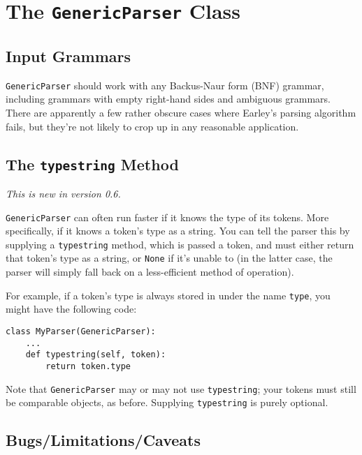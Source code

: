 \documentclass{article}
\newcommand{\code}[1]{\texttt{#1}}
\begin{document}
\section{The \code{GenericParser} Class}

\subsection{Input Grammars}

\code{GenericParser} should work with any Backus-Naur form (BNF) grammar,
including grammars
with empty right-hand sides and ambiguous grammars.
There are apparently a few rather obscure cases where Earley's parsing algorithm
fails, but they're not likely to crop up in any reasonable application.

\subsection{The \code{typestring} Method}

\emph{This is new in version 0.6.}

\code{GenericParser} can often run faster if it knows the type of its
tokens.  More specifically, if it knows a token's type as a string.  You
can tell the parser this by supplying a \code{typestring} method, which is
passed a token, and must either return that token's type as a string, or
\code{None} if it's unable to (in the latter case, the parser will simply
fall back on a less-efficient method of operation).

For example, if a token's type is always stored in under the name \code{type},
you might have the following code:

\begin{verbatim}
class MyParser(GenericParser):
    ...
    def typestring(self, token):
        return token.type
\end{verbatim}

Note that \code{GenericParser} may or may not use \code{typestring}; your
tokens must still be comparable objects, as before.  Supplying \code{typestring}
is purely optional.

\subsection{Bugs/Limitations/Caveats}
\end{document}
